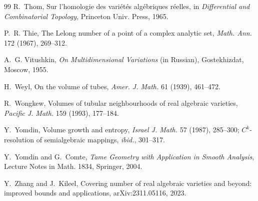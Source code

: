 \documentclass[11pt]{article}
\begin{document}
\begin{thebibliography}{99}
 R.~Thom, Sur l'homologie des vari\'et\'es alg\'ebriques
r\'eelles, in \emph{Differential and Combinatorial Topology}, Princeton Univ.
Press, 1965.

 P.~R. Thie, The Lelong number of a point of a complex analytic
set, \emph{Math. Ann.} 172 (1967), 269--312.

 A.~G. Vitushkin, \emph{On Multidimensional Variations} (in
Russian), Gostekhizdat, Moscow, 1955.

 H.~Weyl, On the volume of tubes, \emph{Amer. J. Math.} 61
(1939), 461--472.

 R.~Wongkew, Volumes of tubular neighbourhoods of real algebraic
varieties, \emph{Pacific J. Math.} 159 (1993), 177--184.

 Y.~Yomdin, Volume growth and entropy, \emph{Israel J. Math.} 57
(1987), 285--300; $C^k$-resolution of semialgebraic mappings, \emph{ibid.},
301--317.

 Y.~Yomdin and G.~Comte, \emph{Tame Geometry with Application in
Smooth Analysis}, Lecture Notes in Math. 1834, Springer, 2004.

 Y.~Zhang and J.~Kileel, Covering number of real algebraic
varieties and beyond: improved bounds and applications, arXiv:2311.05116, 2023.

\end{thebibliography}
\end{document}
